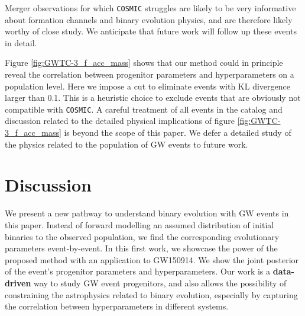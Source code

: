\documentclass[twocolumn]{aastex631}
\begin{document}
Merger observations for which \texttt{COSMIC} struggles are likely to be very
informative about formation channels and binary evolution physics, and are
therefore likely worthy of close study.  We anticipate that future work will
follow up these events in detail.

Figure \ref{fig:GWTC-3_f_acc_mass} shows that our method could in principle
reveal the correlation between progenitor parameters and hyperparameters on a
population level. Here we impose a cut to eliminate events with KL divergence
larger than 0.1. This is a heuristic choice to exclude events that are obviously
not compatible with \texttt{COSMIC}. A careful treatment of all events in the
catalog and discussion related to the detailed physical implications of figure
\ref{fig:GWTC-3_f_acc_mass} is beyond the scope of this paper.  We defer a
detailed study of the physics related to the population of GW events to future
work.



\section{Discussion}
\label{sec:discussion}


We present a new pathway to understand binary evolution with GW events in this
paper. Instead of forward modelling an assumed distribution of initial binaries
to the observed population, we find the corresponding evolutionary parameters
event-by-event. In this first work, we showcase the power of the proposed method
with an application to GW150914. We show the joint posterior of the event's
progenitor parameters and hyperparameters.  Our work is a \textbf{data-driven}
way to study GW event progenitors, and also allows the possibility of
constraining the astrophysics related to binary evolution, especially by
capturing the correlation between hyperparameters in different systems.
\end{document}
